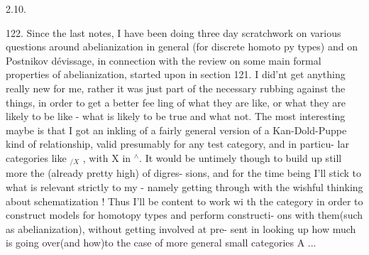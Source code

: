 
2.10.

122. Since the last notes, I have been doing three day  scratchwork
on various questions around abelianization in general (for discrete homoto%
py types) and on Postnikov dévissage, in connection with the review on
some main formal properties of abelianization, started upon in  section 
121. I did'nt get anything really new for me, rather it was just part of
the necessary rubbing against the things, in order to get a better fee\hand{\unsure{-}}%
ling of what they are like, or what  they are likely to be like
- what is likely to be true\hand{,} and what not. The most interesting maybe is
that I got an inkling of a fairly general version of a Kan-Dold-Puppe kind
of relationship,  valid presumably for any  test category, and in particu-%
lar   categories like \hand{$\Delta$}$_{/X}$ , with X in \hand{$\Delta$}$^{\wedge}$. It would be untimely 
though to build up still more the (already pretty high)   of digres-%
sions, and for the time being I'll stick to what is relevant strictly
to my    - namely getting through with the wishful thinking
about schematization ! Thus I'll be content to work wi th the category
\hand{$\Delta$} in order to construct models for homotopy types and perform constructi-%
ons with them(such as abelianization), without getting involved at pre-%
sent  in looking up  how much is going over(and how)to the case of
more general small categories A ...


